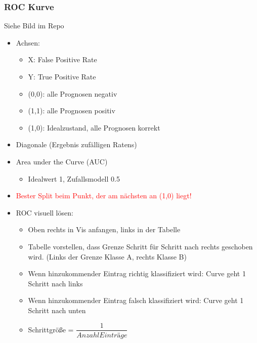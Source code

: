 \documentclass[a4paper]{article}
\begin{document}
\begin{landscape}
\begin{multicols}{3}
        \subsubsection{ROC Kurve}
        Siehe Bild im Repo
        \begin{itemize}[noitemsep,nolistsep]
            \item Achsen:
                \begin{itemize}[noitemsep,nolistsep]
                    \item X: False Positive Rate
                    \item Y: True Positive Rate
                    \item (0,0): alle Prognosen negativ
                    \item (1,1): alle Prognosen positiv 
                    \item (1,0): Idealzustand, alle Prognosen korrekt
                \end{itemize}
            \item Diagonale (Ergebnis zufälligen Ratens)
            \item Area under the Curve (AUC)
                \begin{itemize}[noitemsep,nolistsep]
                    \item Idealwert 1, Zufallsmodell 0.5
                \end{itemize}
            \item \textcolor{red}{Bester Split beim Punkt, der am nächsten an (1,0) liegt!}
            \item ROC visuell lösen:
                \begin{itemize}[noitemsep,nolistsep]
                    \item Oben rechts in Vis anfangen, links in der Tabelle
                    \item Tabelle vorstellen, dass Grenze Schritt für Schritt nach rechts geschoben wird. (Links der Grenze Klasse A, rechts Klasse B)
                    \item Wenn hinzukommender Eintrag richtig klassifiziert wird: Curve geht 1 Schritt nach links
                    \item Wenn hinzukommender Eintrag falsch klassifiziert wird: Curve geht 1 Schritt nach unten
                    \item Schrittgröße = $\dfrac{1}{Anzahl Einträge}$
                \end{itemize}
        \end{itemize}


\end{multicols}
\end{landscape}
\end{document}
